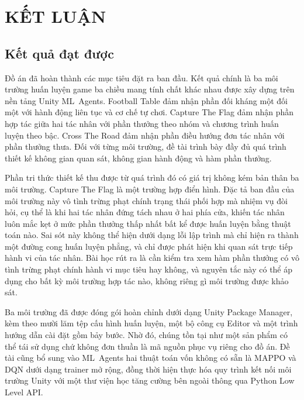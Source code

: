 \fontsize{13pt}{22.5pt}\selectfont

\clearpage
\section{KẾT LUẬN}

\subsection{Kết quả đạt được}
\indent Đồ án đã hoàn thành các mục tiêu đặt ra ban đầu. Kết quả chính là ba môi trường
huấn luyện game ba chiều mang tính chất khác nhau được xây dựng trên nền tảng Unity
ML~Agents. Football Table đảm nhận phần đối kháng một đối một với hành động liên tục và
cơ chế tự chơi. Capture The Flag đảm nhận phần hợp tác giữa hai tác nhân với phần thưởng
theo nhóm và chương trình huấn luyện theo bậc. Cross The Road đảm nhận phần điều hướng đơn
tác nhân với phần thưởng thưa. Đối với từng môi trường, đề tài trình bày đầy đủ quá trình
thiết kế không gian quan sát, không gian hành động và hàm phần thưởng.

\indent Phần tri thức thiết kế thu được từ quá trình đó có giá trị không kém bản thân ba
môi trường. Capture The Flag là một trường hợp điển hình. Đặc tả ban đầu của môi trường
này vô tình trừng phạt chính trạng thái phối hợp mà nhiệm vụ đòi hỏi, cụ thể là khi hai
tác nhân đứng tách nhau ở hai phía cửa, khiến tác nhân luôn mắc kẹt ở mức phần thưởng thấp
nhất bất kể được huấn luyện bằng thuật toán nào. Sai sót này không thể hiện dưới dạng lỗi
lập trình mà chỉ hiện ra thành một đường cong huấn luyện phẳng, và chỉ được phát hiện khi
quan sát trực tiếp hành vi của tác nhân. Bài học rút ra là cần kiểm tra xem hàm phần
thưởng có vô tình trừng phạt chính hành vi mục tiêu hay không, và nguyên tắc này có thể áp
dụng cho bất kỳ môi trường hợp tác nào, không riêng gì môi trường được khảo sát.

\indent Ba môi trường đã được đóng gói hoàn chỉnh dưới dạng Unity Package Manager, kèm
theo mười lăm tệp cấu hình huấn luyện, một bộ công cụ Editor và một trình hướng dẫn cài
đặt gồm bảy bước. Nhờ đó, chúng tồn tại như một sản phẩm có thể tái sử dụng chứ không đơn
thuần là mã nguồn phục vụ riêng cho đồ án. Đề tài cũng bổ sung vào ML~Agents hai thuật
toán vốn không có sẵn là MAPPO và DQN dưới dạng trainer mở rộng, đồng thời hiện thực hóa
quy trình kết nối môi trường Unity với một thư viện học tăng cường bên ngoài thông qua
Python Low Level API.

